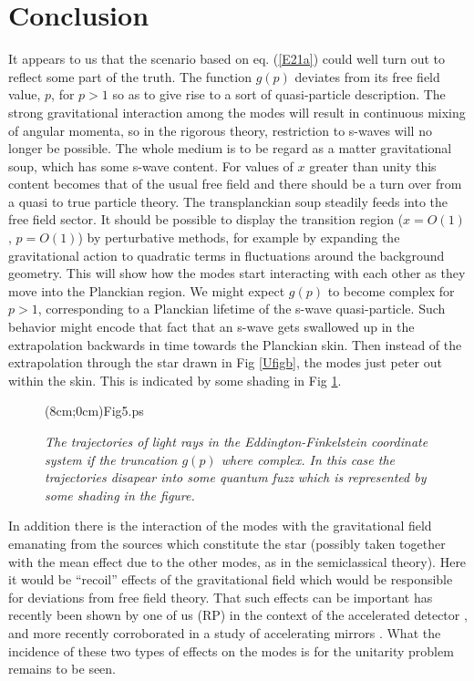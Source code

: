 \documentclass[12pt]{article}
\newcommand{\figprov}[4]{
\begin{figure}[hbt]
\begin{center}\mbox{\psboxto(#1;0cm){#4}}\end{center}
\caption{\it #3}
\label{#2}
\end{figure}
}
\begin{document}
\section{Conclusion}\label{SS7}
It appears to us that the scenario based on  eq. (\ref{E21a}) could well turn
out to reflect some part of the truth. The function $g(p)$ deviates from its free field
value, $p$, for $p>1$ so as to give rise to a sort of quasi-particle
description. The strong gravitational interaction among the modes will result
in continuous mixing of angular momenta, so in the rigorous theory,
restriction to s-waves will no longer be possible. The whole medium is to be
regard as a matter gravitational soup, which has some s-wave content. For
values of $x$ greater than unity this content becomes that of the usual free
field and there should be a turn over from a quasi to true particle theory.
The transplanckian soup steadily feeds into the free field
sector. It should be possible to display the transition region ($x=O(1)$,
$p=O(1)$) by perturbative methods, for example by expanding the gravitational
action to quadratic terms in fluctuations around the background geometry. This
will show how the modes start interacting with each other as they move into the
Planckian region. We might expect $g(p)$ to become complex for $p>1$,
corresponding to a Planckian lifetime of the s-wave quasi-particle. Such
behavior might encode that fact that an s-wave gets swallowed up in the
extrapolation backwards in time towards the Planckian skin. Then instead of the
extrapolation through the star drawn in Fig \ref{Ufigb}, the modes just peter
out within the skin. This is indicated by some shading in Fig \ref{Ufigd}.



\figprov{8cm}{Ufigd}{The  trajectories of  light rays 
 in the Eddington-Finkelstein coordinate
system if the truncation $g(p)$ where complex. In this case
the trajectories disapear into some quantum fuzz which is
represented by some shading in the figure.}{Fig5.ps} 



In addition there is the interaction of the modes with the gravitational field
emanating from the sources which constitute the star (possibly taken together
with the mean effect due to the other modes, as in the semiclassical theory).
Here it would be ``recoil'' effects of the gravitational field which would be
responsible for deviations from free field theory. That such effects can
be important has recently been shown by one of us (RP) in the context of
the accelerated detector \cite{Par}, and more recently corroborated in a study of
accelerating mirrors \cite{ParII}. What the incidence of these two types of
effects on the modes is for the unitarity problem 
 remains to be seen.
\end{document}
